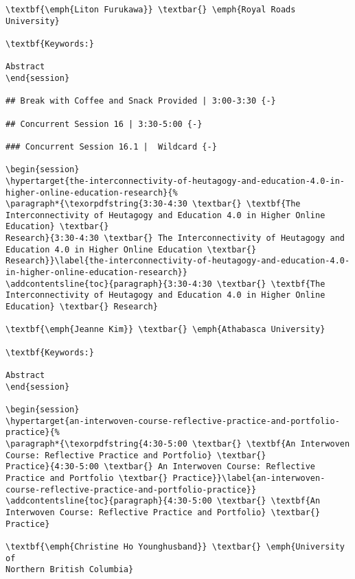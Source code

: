\documentclass[
]{book}
\begin{document}
\begin{verbatim}
\textbf{\emph{Liton Furukawa}} \textbar{} \emph{Royal Roads University}

\textbf{Keywords:}

Abstract
\end{session}

## Break with Coffee and Snack Provided | 3:00-3:30 {-}

## Concurrent Session 16 | 3:30-5:00 {-}

### Concurrent Session 16.1 |  Wildcard {-}

\begin{session}
\hypertarget{the-interconnectivity-of-heutagogy-and-education-4.0-in-higher-online-education-research}{%
\paragraph*{\texorpdfstring{3:30-4:30 \textbar{} \textbf{The
Interconnectivity of Heutagogy and Education 4.0 in Higher Online
Education} \textbar{}
Research}{3:30-4:30 \textbar{} The Interconnectivity of Heutagogy and Education 4.0 in Higher Online Education \textbar{} Research}}\label{the-interconnectivity-of-heutagogy-and-education-4.0-in-higher-online-education-research}}
\addcontentsline{toc}{paragraph}{3:30-4:30 \textbar{} \textbf{The
Interconnectivity of Heutagogy and Education 4.0 in Higher Online
Education} \textbar{} Research}

\textbf{\emph{Jeanne Kim}} \textbar{} \emph{Athabasca University}

\textbf{Keywords:}

Abstract
\end{session}

\begin{session}
\hypertarget{an-interwoven-course-reflective-practice-and-portfolio-practice}{%
\paragraph*{\texorpdfstring{4:30-5:00 \textbar{} \textbf{An Interwoven
Course: Reflective Practice and Portfolio} \textbar{}
Practice}{4:30-5:00 \textbar{} An Interwoven Course: Reflective Practice and Portfolio \textbar{} Practice}}\label{an-interwoven-course-reflective-practice-and-portfolio-practice}}
\addcontentsline{toc}{paragraph}{4:30-5:00 \textbar{} \textbf{An
Interwoven Course: Reflective Practice and Portfolio} \textbar{}
Practice}

\textbf{\emph{Christine Ho Younghusband}} \textbar{} \emph{University of
Northern British Columbia}


\end{verbatim}
\end{document}
